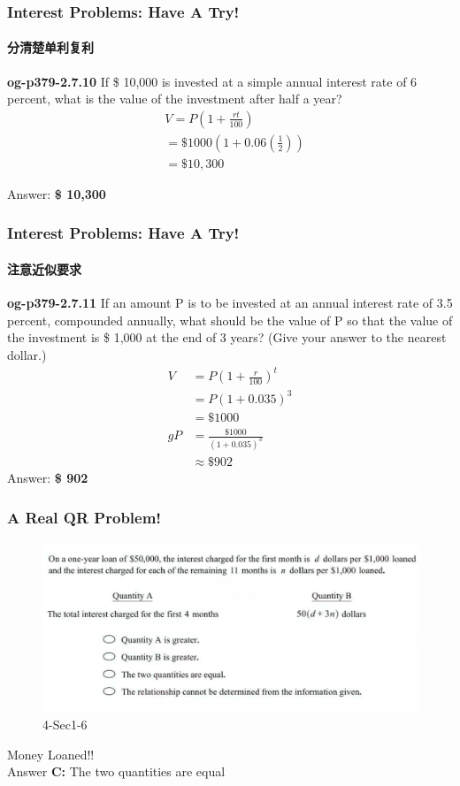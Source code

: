 \documentclass[
	11pt, %
]{beamer}
\begin{document}


\begin{frame}
	\frametitle{Interest Problems: Have A Try!}
	\framesubtitle{分清楚单利复利}
	\textbf{og-p379-2.7.10}
If \$ 10,000 is invested at a simple annual interest rate of 6 percent, what is the value of the investment after half a year?
	\bigskip
	\pause
	\begin{equation*}
	  \begin{aligned}
	  		&V =P(1 + \frac{rt}{100})\\
		    &= \$ 1000(1+0.06 (\frac{1}{2}))\\
		    &= \$ 10,300
	  \end{aligned}
	\end{equation*}

	\pause
	\bigskip
	Answer: \textbf{\$ 10,300}
\end{frame}



\begin{frame}
	\frametitle{Interest Problems: Have A Try!}
	\framesubtitle{注意近似要求}
	\textbf{og-p379-2.7.11}
If an amount P is to be invested at an annual interest rate
of 3.5 percent, compounded annually, what should be the value of P so
that the value of the investment is \$ 1,000 at the end of 3 years? (Give your
answer to the nearest dollar.)
	\bigskip
	\pause
	\begin{equation*}
		\begin{aligned}
					V &=P(1 + \frac{r}{100})^t \\
					  &= P(1+ 0.035)^3\\
					  &= \$ 1000 \\
g			    P &= \frac{\$ 1000 }{(1+ 0.035)^3}\\
			      &\approx \$ 902 					 
		\end{aligned}		
	\end{equation*}
	\pause
	\bigskip
	Answer: \textbf{\$ 902 }
\end{frame}



\begin{frame}
	\frametitle{A Real QR Problem!}
	\framesubtitle{}
	\begin{figure}
		\includegraphics[width=\linewidth]{Interest_Example_Question1.png}
		\caption{4-Sec1-6}
	\end{figure}
	\pause
\alert{Money Loaned!!}\\
	\bigskip
	Answer \textbf{C: } The two quantities are equal
\end{frame}
\end{document}
